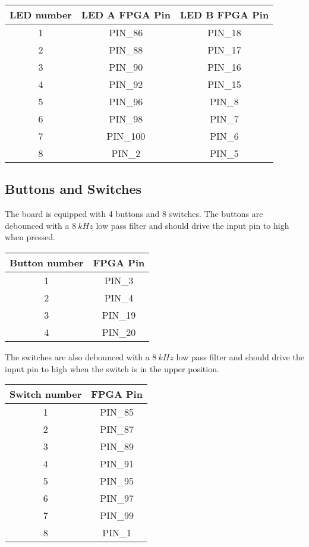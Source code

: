 \begin{center}
	\begin{tabular}{c c c}
		LED number & LED A FPGA Pin & LED B FPGA Pin \\
		\hline
		1 & PIN\_86 & PIN\_18 \\
		2 & PIN\_88 & PIN\_17 \\
		3 & PIN\_90 & PIN\_16 \\
		4 & PIN\_92 & PIN\_15 \\
		5 & PIN\_96 & PIN\_8 \\
		6 & PIN\_98 & PIN\_7 \\
		7 & PIN\_100 & PIN\_6 \\
		8 & PIN\_2 & PIN\_5 \\
		\hline
	\end{tabular}
\end{center}

\subsection{Buttons and Switches}
The board is equipped with 4 buttons and 8 switches.
The buttons are debounced with a $\SI{8}{kHz}$ low pass filter and should drive the input pin to high when pressed.

\begin{center}
	\begin{tabular}{c c}
		Button number & FPGA Pin \\
		\hline
		1 & PIN\_3 \\
		2 & PIN\_4 \\
		3 & PIN\_19 \\
		4 & PIN\_20 \\
		\hline
	\end{tabular}
\end{center}

The switches are also debounced with a $\SI{8}{kHz}$ low pass filter and should drive the input pin to high when the switch is in the upper position.

\begin{center}
	\begin{tabular}{c c}
		Switch number & FPGA Pin \\
		\hline
		1 & PIN\_85 \\
		2 & PIN\_87 \\
		3 & PIN\_89 \\
		4 & PIN\_91 \\
		5 & PIN\_95 \\
		6 & PIN\_97 \\
		7 & PIN\_99 \\
		8 & PIN\_1 \\
		\hline
	\end{tabular}
\end{center}

